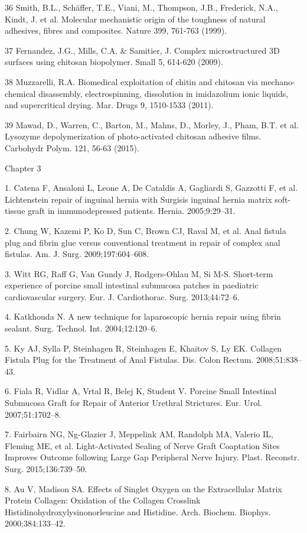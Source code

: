36	Smith, B.L., Schäffer, T.E., Viani, M., Thompson, J.B., Frederick, N.A., Kindt, J. et al. Molecular mechanistic origin of the toughness of natural adhesives, fibres and composites. Nature 399, 761-763 (1999).

37	Fernandez, J.G., Mills, C.A. \& Samitier, J. Complex microstructured 3D surfaces using chitosan biopolymer. Small 5, 614-620 (2009). 

38	Muzzarelli, R.A. Biomedical exploitation of chitin and chitosan via mechano-chemical disassembly, electrospinning, dissolution in imidazolium ionic liquids, and supercritical drying. Mar. Drugs 9, 1510-1533 (2011). 

39	Mawad, D., Warren, C., Barton, M., Mahns, D., Morley, J., Pham, B.T. et al. Lysozyme depolymerization of photo-activated chitosan adhesive films. Carbohydr Polym. 121, 56-63 (2015). 

\large{Chapter 3}

1. 	Catena F, Ansaloni L, Leone A, De Cataldis A, Gagliardi S, Gazzotti F, et al. Lichtenstein repair of inguinal hernia with Surgisis inguinal hernia matrix soft-tissue graft in immunodepressed patients. Hernia. 2005;9:29–31. 

2. 	Chung W, Kazemi P, Ko D, Sun C, Brown CJ, Raval M, et al. Anal fistula plug and fibrin glue versus conventional treatment in repair of complex anal fistulas. Am. J. Surg. 2009;197:604–608. 

3. 	Witt RG, Raff G, Van Gundy J, Rodgers-Ohlau M, Si M-S. Short-term experience of porcine small intestinal submucosa patches in paediatric cardiovascular surgery. Eur. J. Cardiothorac. Surg. 2013;44:72–6. 

4. 	Katkhouda N. A new technique for laparoscopic hernia repair using fibrin sealant. Surg. Technol. Int. 2004;12:120–6. 

5. 	Ky AJ, Sylla P, Steinhagen R, Steinhagen E, Khaitov S, Ly EK. Collagen Fistula Plug for the Treatment of Anal Fistulas. Dis. Colon Rectum. 
2008;51:838–43. 

6. 	Fiala R, Vidlar A, Vrtal R, Belej K, Student V. Porcine Small Intestinal Submucosa Graft for Repair of Anterior Urethral Strictures. Eur. Urol. 2007;51:1702–8. 

7. 	Fairbairn NG, Ng-Glazier J, Meppelink AM, Randolph MA, Valerio IL, Fleming ME, et al. Light-Activated Sealing of Nerve Graft Coaptation Sites Improves Outcome following Large Gap Peripheral Nerve Injury. Plast. Reconstr. Surg. 2015;136:739–50. 

8. 	Au V, Madison SA. Effects of Singlet Oxygen on the Extracellular Matrix Protein Collagen: Oxidation of the Collagen Crosslink Histidinohydroxylysinonorleucine and Histidine. Arch. Biochem. Biophys. 2000;384:133–42. 

